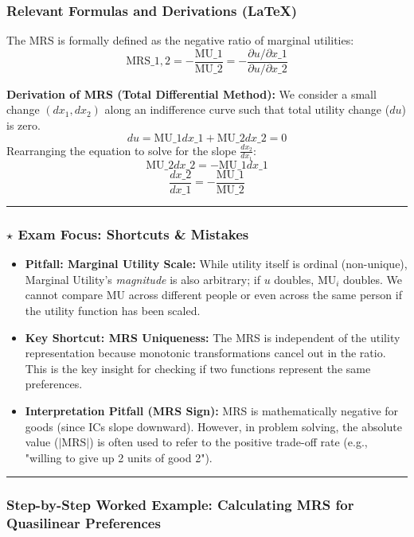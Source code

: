 \documentclass{article}
\begin{document}
\subsubsection*{Relevant Formulas and Derivations (LaTeX)}

The MRS is formally defined as the negative ratio of marginal utilities: \[\text{MRS}\_{1,2} = -\frac{\text{MU}\_1}{\text{MU}\_2} = -\frac{\partial u/\partial x\_1}{\partial u/\partial x\_2}\]

\textbf{Derivation of MRS (Total Differential Method):} We consider a small change $(dx_1, dx_2)$ along an indifference curve such that total utility change ($du$) is zero. \[du = \text{MU}\_1 dx\_1 + \text{MU}\_2 dx\_2 = 0\] Rearranging the equation to solve for the slope $\frac{dx_2}{dx_1}$: \[\text{MU}\_2 dx\_2 = -\text{MU}\_1 dx\_1\] \[\frac{dx\_2}{dx\_1} = -\frac{\text{MU}\_1}{\text{MU}\_2}\]

\noindent\rule{\linewidth}{0.4pt}

\subsubsection*{$\star$ Exam Focus: Shortcuts \& Mistakes}
\begin{itemize}
    \item \textbf{Pitfall: Marginal Utility Scale:} While utility itself is ordinal (non-unique), Marginal Utility's \textit{magnitude} is also arbitrary; if $u$ doubles, $\text{MU}_i$ doubles. We cannot compare MU across different people or even across the same person if the utility function has been scaled.

    \item \textbf{Key Shortcut: MRS Uniqueness:} The MRS is independent of the utility representation because monotonic transformations cancel out in the ratio. This is the key insight for checking if two functions represent the same preferences.

    \item \textbf{Interpretation Pitfall (MRS Sign):} MRS is mathematically negative for goods (since ICs slope downward). However, in problem solving, the absolute value ($|\text{MRS}|$) is often used to refer to the positive trade-off rate (e.g., "willing to give up 2 units of good 2").
\end{itemize}

\noindent\rule{\linewidth}{0.4pt}

\subsubsection*{Step-by-Step Worked Example: Calculating MRS for Quasilinear Preferences}
\end{document}
